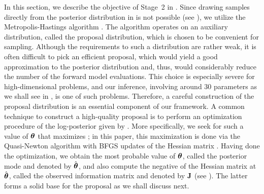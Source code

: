 In this section, we describe the objective of Stage~2 in .
Since drawing samples directly from the posterior distribution in  is not possible (see ), we utilize the Metropolis-Hastings algorithm \cite{gelman2004}.
The algorithm operates on an auxiliary distribution, called the proposal distribution, which is chosen to be convenient for sampling.
Although the requirements to such a distribution are rather weak, it is often difficult to pick an efficient proposal, which would yield a good approximation to the posterior distribution and, thus, would considerably reduce the number of the forward model evaluations.
This choice is especially severe for high-dimensional problems, and our inference, involving around 30 parameters as we shall see in , is one of such problems.
Therefore, a careful construction of the proposal distribution is an essential component of our framework.
A common technique to construct a high-quality proposal is to perform an optimization procedure of the log-posterior given by .
More specifically, we seek for such a value of ${\boldsymbol\theta}$ that maximizes ; in this paper, this maximization is done via the Quasi-Newton algorithm with BFGS updates of the Hessian matrix \cite{press2007}.
Having done the optimization, we obtain the most probable value of ${\boldsymbol\theta}$, called the posterior mode and denoted by $\hat{{\boldsymbol\theta}}$, and also compute the negative of the Hessian matrix at $\hat{{\boldsymbol\theta}}$, called the observed information matrix and denoted by $\mathbf{J}$ (see ).
The latter forms a solid base for the proposal as we shall discuss next.
